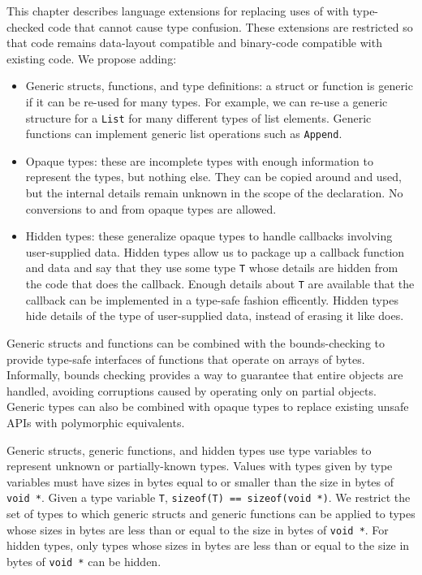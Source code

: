 This chapter describes language extensions for replacing uses of \uncheckedptrvoid{}
with type-checked code that cannot cause type confusion.   These extensions
are restricted so that code remains data-layout compatible and binary-code
compatible with existing code.  We propose adding:
\begin{itemize}
\item Generic structs, functions, and type definitions:
a struct or function is generic if it can be re-used for many types.  For example,
we can re-use a generic structure for a  \lstinline+List+ for many different types of list
elements.  Generic functions can implement generic list operations such as \lstinline+Append+.

\item Opaque types: these are incomplete types with enough information to represent
the types, but nothing else.  They can be copied around and used, but the internal
details remain unknown in the scope of the declaration.  No conversions to and 
from opaque types are allowed.

\item Hidden types: these generalize opaque types to handle callbacks involving
user-supplied data.  Hidden types allow us to package up a callback function and data and
say that they use  some type \lstinline+T+ whose details are hidden from the code that does
the callback.   Enough details about \lstinline+T+ are available that the callback can be 
implemented in a type-safe fashion efficently.  Hidden types hide details of the type 
of user-supplied data, instead of erasing it like \uncheckedptrvoid{} does.
\end{itemize}

Generic structs and functions can be combined with the bounds-checking 
to provide type-safe interfaces of functions that operate on arrays of bytes.
Informally, bounds checking provides a way to guarantee that entire objects are handled,
avoiding corruptions caused by operating only on partial objects.  Generic types
can also be combined with opaque types to replace existing unsafe APIs with polymorphic
equivalents.

Generic structs, generic functions, and hidden types use type variables to represent
unknown or partially-known types. Values with types given by type variables must
have sizes in bytes equal to or smaller than the size in bytes of \lstinline+void *+. 
Given a  type variable \lstinline+T+, \lstinline+sizeof(T) == sizeof(void *)+.  We 
restrict the set of types to which generic structs and generic functions can be applied
to  types whose sizes in bytes are less than or equal to the size in bytes 
of \lstinline+void *+. For hidden types, only types whose sizes  in bytes are less than 
or equal to the size in bytes of \lstinline+void *+ can be hidden.

